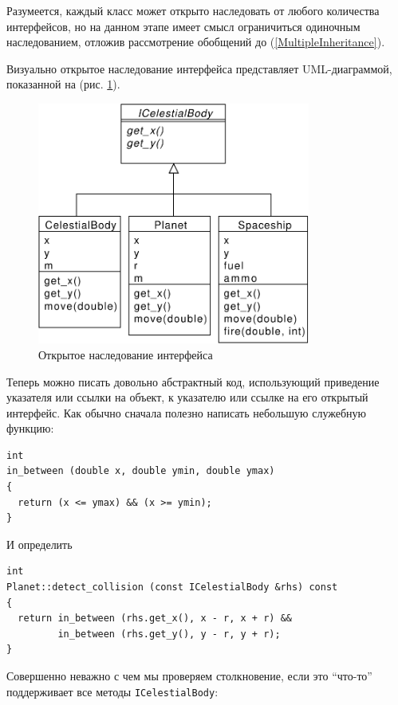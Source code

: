 \documentclass[a4paper,12pt,oneside]{article}
\begin{document}
Разумеется, каждый класс может открыто наследовать от любого количества интерфейсов, но на данном этапе имеет смысл ограничиться одиночным наследованием, отложив рассмотрение обобщений до (\ref{MultipleInheritance}).

Визуально открытое наследование интерфейса представляет UML-диаграммой, показанной на (рис. \ref{fig:inheritance-interface}).

\begin{figure}[ht]
\centering
\includegraphics[width=0.8\textwidth]{illustrations/intf-inheritance-crop.pdf}
\caption{Открытое наследование интерфейса}
\label{fig:inheritance-interface}
\end{figure}

Теперь можно писать довольно абстрактный код, использующий приведение указателя или ссылки на объект, к указателю или ссылке на его открытый интерфейс. Как обычно сначала полезно написать небольшую служебную функцию:

\begin{lstlisting}
int 
in_between (double x, double ymin, double ymax)
{
  return (x <= ymax) && (x >= ymin);
}
\end{lstlisting}

И определить

\begin{lstlisting}
int 
Planet::detect_collision (const ICelestialBody &rhs) const
{
  return in_between (rhs.get_x(), x - r, x + r) && 
         in_between (rhs.get_y(), y - r, y + r);
}
\end{lstlisting}

Совершенно неважно с чем мы проверяем столкновение, если это ``что-то'' поддерживает все методы \lstinline!ICelestialBody!:
\end{document}
